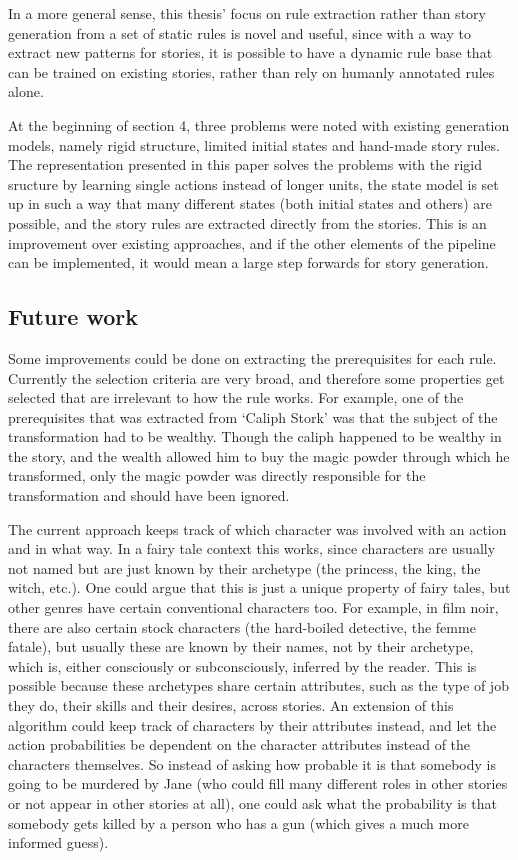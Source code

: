 In a more general sense, this thesis' focus on rule extraction rather than story
generation from a set of static rules is novel and useful, since with a way to
extract new patterns for stories, it is possible to have a dynamic rule base
that can be trained on existing stories, rather than rely on humanly annotated
rules alone.

At the beginning of section 4, three problems were noted with existing
generation models, namely rigid structure, limited initial states and hand-made
story rules. The representation presented in this paper solves the problems with the rigid
sructure by learning single actions instead of longer units, the state model is
set up in such a way that many different states (both initial states and others)
are possible, and the story rules are extracted directly from the stories. This
is an improvement over existing approaches, and if the other elements of the
pipeline can be implemented, it would mean a large step forwards for story
generation.

\subsection{Future work}

Some improvements could be done on extracting the prerequisites for each rule.
Currently the selection criteria are very broad, and therefore some properties
get selected that are irrelevant to how the rule works. For example, one of the
prerequisites that was extracted from `Caliph Stork' was that the subject of the
transformation had to be wealthy. Though the caliph happened to be wealthy in
the story, and the wealth allowed him to buy the magic powder through which he
transformed, only the magic powder was directly responsible for the
transformation and should have been ignored.

The current approach keeps track of which
character was involved with an action and in what way. In a fairy tale context
this works, since characters are usually not named but are just known by their
archetype (the princess, the king, the witch, etc.). One could argue that this
is just a unique property of fairy tales, but other genres have certain
conventional characters
too. For example, in film noir, there are also certain stock characters (the
hard-boiled detective, the femme fatale), but usually these are
known by their names, not by their archetype, which is, either consciously or
subconsciously, inferred by the reader. This is possible because these
archetypes share certain attributes, such as the type of job they do, their
skills and their desires, across stories. An extension of this algorithm
could keep track of characters by their attributes instead, and let the action
probabilities be dependent on the character attributes instead of the characters
themselves. So instead of asking how probable it is that somebody is going to be
murdered by Jane (who could fill many different roles in other stories or not
appear in other stories at all), one could ask what the probability is that somebody gets
killed by a person who has a gun (which gives a much more informed guess).

